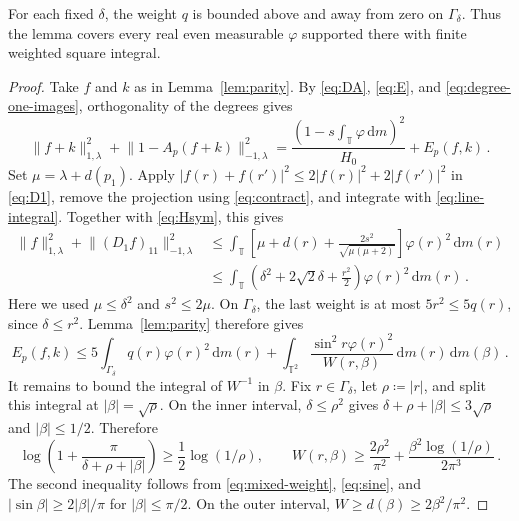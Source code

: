 \documentclass[11pt]{amsart}
\theoremstyle{plain}
\theoremstyle{definition}
\newcommand{\T}{\mathbb T}
\newcommand{\1}{\mathbf 1}
\newcommand{\norm}[1]{\lVert #1\rVert}
\newcommand{\abs}[1]{\lvert #1\rvert}
\newcommand{\dd}{\,\mathrm d}
\newcommand{\Hminus}[1]{\norm{#1}_{-1,\lambda}}
\newcommand{\Hplus}[1]{\norm{#1}_{1,\lambda}}
\begin{document}
	For each fixed $\delta$, the weight $q$ is bounded above and away from
	zero on $\Gamma_\delta$.  Thus the lemma covers every real even measurable
	$\varphi$ supported there with finite weighted square integral.
	
	\begin{proof}
		Take $f$ and $k$ as in Lemma~\ref{lem:parity}.
		By \eqref{eq:DA}, \eqref{eq:E}, and \eqref{eq:degree-one-images},
		orthogonality of the degrees gives
		\begin{equation}\label{eq:uncancelled}
			\Hplus{f+k}^2+\Hminus{1-A_p(f+k)}^2
			=\frac{\left(1-s\int_\T\varphi\dd m\right)^2}{H_0}+E_p(f,k)\, .
		\end{equation}
		Set $\mu=\lambda+d(p_1)$.  Apply
		$\abs{f(r)+f(r')}^2\leq2\abs{f(r)}^2+2\abs{f(r')}^2$ in
		\eqref{eq:D1}, remove the projection using \eqref{eq:contract}, and
		integrate with \eqref{eq:line-integral}.  Together with \eqref{eq:Hsym},
		this gives
		\begin{equation}\label{eq:degree-one-cost}
			\begin{split}
				\Hplus f^2+\Hminus{(D_1f)_{11}}^2
				&\leq\int_\T\left[\mu+d(r)+
				\frac{2s^2}{\sqrt{\mu(\mu+2)}}\right]\varphi(r)^2\dd m(r)\\
				&\leq\int_\T\left(\delta^2+2\sqrt2\delta+\frac{r^2}{2}\right)
				\varphi(r)^2\dd m(r)\, .
			\end{split}
		\end{equation}
		Here we used $\mu\leq\delta^2$ and $s^2\leq2\mu$.
		On $\Gamma_\delta$, the last weight is at most $5r^2\leq5q(r)$,
		since $\delta\leq r^2$.  Lemma~\ref{lem:parity} therefore gives
		\begin{equation}\label{eq:energy-reduction}
			E_p(f,k)\leq5\int_{\Gamma_\delta}q(r)\varphi(r)^2\dd m(r)
			+\int_{\T^2}\frac{\sin^2r\varphi(r)^2}{W(r,\beta)}
			\dd m(r)\dd m(\beta)\, .
		\end{equation}
		It remains to bound the integral of $W^{-1}$ in $\beta$.
		Fix $r\in\Gamma_\delta$, let $\rho\coloneqq\abs r$, and split this integral at
		$\abs\beta=\sqrt\rho$.
		On the inner interval, $\delta\leq\rho^2$ gives
		$\delta+\rho+\abs\beta\leq3\sqrt\rho$ and
		$\abs\beta\leq1/2$.  Therefore
		\[
		\log\left(1+\frac\pi{\delta+\rho+\abs\beta}\right)
		\geq\frac12\log(1/\rho),\qquad
		W(r,\beta)\geq\frac{2\rho^2}{\pi^2}
		+\frac{\beta^2\log(1/\rho)}{2\pi^3}\, .
		\]
		The second inequality follows from \eqref{eq:mixed-weight},
		\eqref{eq:sine}, and $\abs{\sin\beta}\geq2\abs\beta/\pi$
		for $\abs\beta\leq\pi/2$.
		On the outer interval, $W\geq d(\beta)\geq2\beta^2/\pi^2$.

\end{proof}
\end{document}

